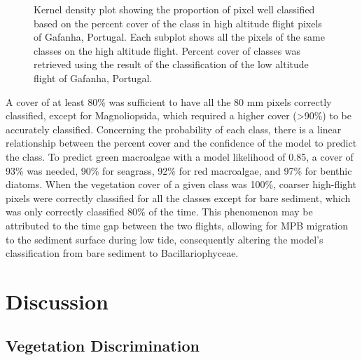 \documentclass[
  letterpaper,
  11pt,
  english,
  singlespacing,
  headsepline]{MastersDoctoralThesis}
\begin{document}
\begin{spacing}{1.5}
\begin{figure}
{}

\caption{\label{fig-upscaling}Kernel density plot showing the proportion
of pixel well classified based on the percent cover of the class in high
altitude flight pixels of Gafanha, Portugal. Each subplot shows all the
pixels of the same classes on the high altitude flight. Percent cover of
classes was retrieved using the result of the classification of the low
altitude flight of Gafanha, Portugal.}

\end{figure}%

A cover of at least 80\% was sufficient to have all the 80 mm pixels
correctly classified, except for Magnoliopsida, which required a higher
cover (\textgreater90\%) to be accurately classified. Concerning the
probability of each class, there is a linear relationship between the
percent cover and the confidence of the model to predict the class. To
predict green macroalgae with a model likelihood of 0.85, a cover of
93\% was needed, 90\% for seagrass, 92\% for red macroalgae, and 97\%
for benthic diatoms. When the vegetation cover of a given class was
100\%, coarser high-flight pixels were correctly classified for all the
classes except for bare sediment, which was only correctly classified
80\% of the time. This phenomenon may be attributed to the time gap
between the two flights, allowing for MPB migration to the sediment
surface during low tide, consequently altering the model's
classification from bare sediment to Bacillariophyceae.

\section{Discussion}\label{discussion-1}

\subsection{Vegetation Discrimination}\label{vegetation-discrimination}


\end{spacing}
\end{document}
